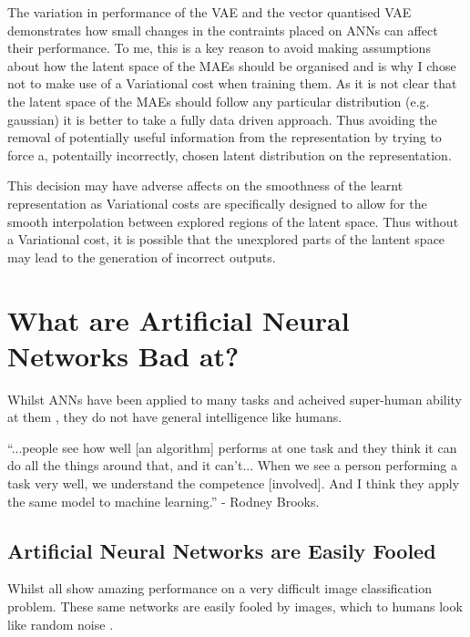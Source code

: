 The variation in performance of the \ac{VAE} and the vector quantised \ac{VAE} demonstrates how small changes in the contraints placed on \acp{ANN} can affect their performance. To me, this is a key reason to avoid making assumptions about how the latent space of the \acp{MAE} should be organised and is why I chose not to make use of a Variational cost when training them. As it is not clear that the latent space of the \acp{MAE} should follow any particular distribution (e.g. gaussian) it is better to take a fully data driven approach. Thus avoiding the removal of potentially useful information from the representation by trying to force a, potentailly incorrectly, chosen latent distribution on the representation.

This decision may have adverse affects on the smoothness of the learnt representation as Variational costs are specifically designed to allow for the smooth interpolation between explored regions of the latent space. Thus without a Variational cost, it is possible that the unexplored parts of the lantent space may lead to the generation of incorrect outputs.

\section{What are Artificial Neural Networks Bad at?}
Whilst \acp{ANN} have been applied to many tasks and acheived super-human ability at them \cite{vinyals2019alphastar}, they do not have general intelligence like humans.

\begin{displayquote}
``...people see how well [an algorithm] performs at one task and they think it can do all the things around that, and it can’t... When we see a person performing a task very well, we understand the competence [involved]. And I think they apply the same model to machine learning.'' - Rodney Brooks.
\end{displayquote}

\subsection{Artificial Neural Networks are Easily Fooled}
Whilst \cite{krizhevsky2012imagenet, simonyan2014very, szegedy2015going, szegedy2016rethinking, szegedy2017inception, he2016deep, huang2017densely, russakovsky2015imagenet, chiu2018state, eslami2018neural} all show amazing performance on a very difficult image classification problem. These same networks are easily fooled by images, which to humans look like random noise \cite{nguyen2015deep}.


